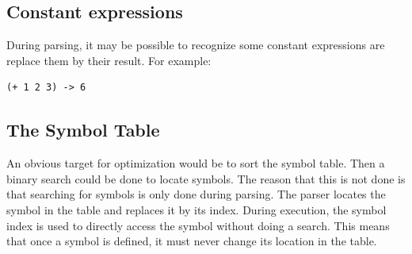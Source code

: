 \documentclass[10pt, openany]{book}
\begin{document}
\subsection{Constant expressions}
During parsing, it may be possible to recognize some constant expressions are replace them by their result.  For example:
\lstset{language=[Tiny]Lisp}
\begin{lstlisting}
(+ 1 2 3) -> 6
\end{lstlisting}

\subsection{The Symbol Table}
An obvious target for optimization would be to sort the symbol table.  Then a binary search could be done to locate symbols.  The reason that this is not done is that searching for symbols is only done during parsing.  The parser locates the symbol in the table and replaces it by its index.  During execution, the symbol index is used to directly access the symbol without doing a search.  This means that once a symbol is defined, it must never change its location in the table.
\end{document}
